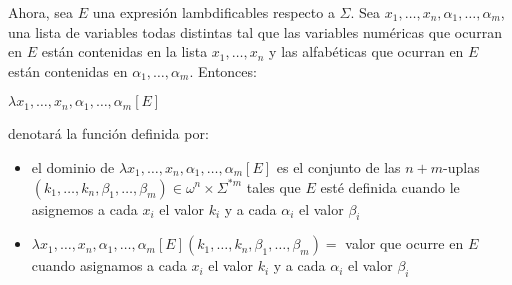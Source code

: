 \documentclass{article}
\begin{document}
        Ahora, sea $E$ una expresión lambdificables respecto a $\Sigma$.
        Sea $x_1, \dots, x_n, \alpha_1, \dots, \alpha_m$, una lista de variables todas
        distintas tal que las variables numéricas que ocurran en $E$ están contenidas 
        en la lista $x_1, \dots, x_n$ y las alfabéticas que ocurran en $E$ 
        están contenidas en $\alpha_1, \dots, \alpha_m$. Entonces:

        \begin{center}
                $\lambda x_1, \dots, x_n, \alpha_1, \dots, \alpha_m [E]$
        \end{center}

        denotará la función definida por:

        \begin{itemize}
                \item el dominio de $\lambda x_1, \dots, x_n, \alpha_1, \dots, \alpha_m [E]$
                es el conjunto de las $n + m$-uplas 
                $(k_1, \dots, k_n, \beta_1, \dots, \beta_m) \in \omega^{n} \times \Sigma^{*m}$
                tales que $E$ esté definida cuando le asignemos a cada $x_i$ el valor $k_i$ 
                y a cada $\alpha_i$ el valor $\beta_i$
                \item $\lambda x_1, \dots, x_n, \alpha_1, \dots, \alpha_m [E]
                (k_1, \dots, k_n, \beta_1, \dots, \beta_m) = $ valor que ocurre en $E$ cuando 
                asignamos a cada $x_i$ el valor $k_i$ 
                y a cada $\alpha_i$ el valor $\beta_i$
        \end{itemize}
\end{document}
